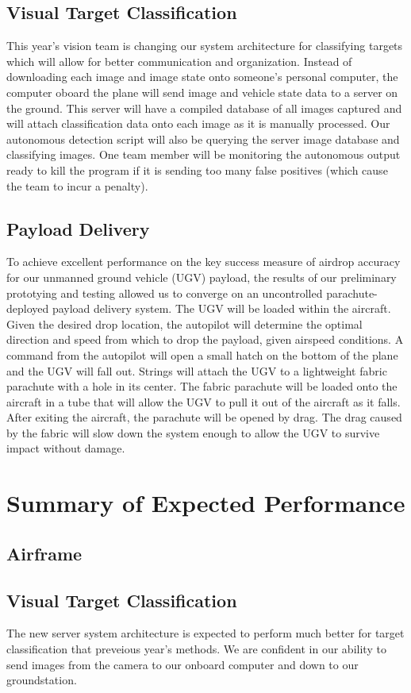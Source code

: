 \documentclass[]{auvsi_doc}
\begin{document}
\subsection{Visual Target Classification}
This year's vision team is changing our system architecture for classifying targets which will
allow for better communication and organization. Instead of downloading each image and image state
onto someone's personal computer, the computer oboard the plane will send image and vehicle state
data to a server on the ground. This server will have a compiled database of all images captured
and will attach classification data onto each image as it is manually processed. Our
autonomous detection script will also be querying the server image database and classifying
images. One team member will be monitoring the autonomous output ready to kill the
program if it is sending too many false positives (which cause the team to incur a
penalty).
\subsection{Payload Delivery}
To achieve excellent performance on the key success measure of airdrop accuracy for our unmanned ground vehicle (UGV) payload, the results of our preliminary prototying and testing allowed us to converge on an uncontrolled parachute-deployed payload delivery system. The UGV will be loaded within the aircraft. Given the desired drop location, the autopilot will determine the optimal direction and speed from which to drop the payload, given airspeed conditions. A command from the autopilot will open a small hatch on the bottom of the plane and the UGV will fall out. Strings will attach the UGV to a lightweight fabric parachute with a hole in its center. The fabric parachute will be loaded onto the aircraft in a tube that will allow the UGV to pull it out of the aircraft as it falls. After exiting the aircraft, the parachute will be opened by drag. The drag caused by the fabric will slow down the system enough to allow the UGV to survive impact without damage.
\section{Summary of Expected Performance}
\subsection{Airframe}
\subsection{Visual Target Classification}
The new server system architecture is expected to perform much better for target classification that preveious year's methods. We are
confident in our ability to send images from the camera to our onboard computer and down to our groundstation.
\end{document}
